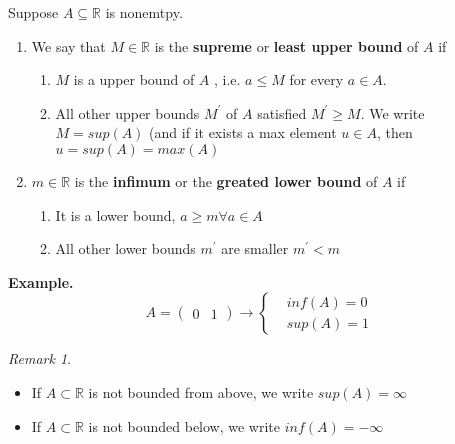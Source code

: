 \documentclass{article}
\theoremstyle{remark}
\newtheorem*{remark}{Remark}
\begin{document}
\begin{definition}
  Suppose $A \subseteq  \mathbb{R} $ is nonemtpy. 
  \begin{enumerate}
    \item We say that $M \in \mathbb{R}  $ is the \textbf{ supreme} or \textbf{least upper bound} of $A$ if 
      \begin{enumerate}
        \item $M$ is a upper bound of $A$ , i.e. $ a \le M$ for every $a \in  A$. 
        \item All other upper bounds $M^{'} $ of $A$ satisfied $M^{'} \ge M$. We write $M = sup \left( A \right)$ (and if it exists a max element $u \in  A$, then $u = sup\left( A \right) = max \left( A \right)$
      \end{enumerate}
    \item $m \in  \mathbb{R} $  is the \textbf{infimum} or the \textbf{greated lower bound}  of $A$ if 
      \begin{enumerate}
        \item It is a lower bound, $a \ge m \forall a \in  A$ 
        \item All other lower bounds $m^{'}$ are smaller $m ^{'} < m$
      \end{enumerate}
  \end{enumerate}
  
\end{definition}
\begin{tcolorbox}
  \textbf{Example.} \[
  A = \begin{pmatrix}
  0  & 1
  \end{pmatrix} 
  \to  
  \begin{cases}
     & inf\left( A \right) = 0 \\
      &  sup\left( A \right) = 1
  \end{cases}
  \] 
\end{tcolorbox}


\begin{remark}
  \begin{itemize}
    \item If $A \subset \mathbb{R} $ is not bounded from above, we write $sup \left( A \right) = \infty$
    \item If $A \subset  \mathbb{R} $ is not bounded below,  we write $inf \left( A \right) = - \infty$
  \end{itemize}
\end{remark}
\end{document}
